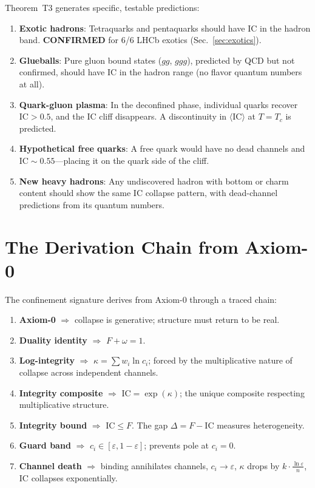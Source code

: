 \documentclass[11pt,a4paper]{article}
\theoremstyle{plain}
\theoremstyle{definition}
\theoremstyle{remark}
\newcommand{\eps}{\varepsilon}
\newcommand{\IC}{\mathrm{IC}}
\begin{document}
Theorem~T3 generates specific, testable predictions:

\begin{enumerate}
\item \textbf{Exotic hadrons}: Tetraquarks and pentaquarks should
  have $\IC$ in the hadron band.
  \textcolor{WeldGreen}{\textbf{CONFIRMED}} for 6/6 LHCb
  exotics (Sec.~\ref{sec:exotics}).

\item \textbf{Glueballs}: Pure gluon bound states ($gg$, $ggg$),
  predicted by QCD but not confirmed, should have $\IC$ in the
  hadron range (no flavor quantum numbers at all).

\item \textbf{Quark-gluon plasma}: In the deconfined phase,
  individual quarks recover $\IC > 0.5$, and the IC cliff
  disappears.  A discontinuity in $\langle\IC\rangle$ at
  $T = T_c$ is predicted.

\item \textbf{Hypothetical free quarks}: A free quark would have
  no dead channels and $\IC \sim 0.55$---placing it on the quark
  side of the cliff.

\item \textbf{New heavy hadrons}: Any undiscovered hadron with
  bottom or charm content should show the same IC collapse
  pattern, with dead-channel predictions from its quantum numbers.
\end{enumerate}


\section{The Derivation Chain from Axiom-0}\label{sec:axiom}

The confinement signature derives from Axiom-0 through a traced
chain:

\begin{enumerate}
\item \textbf{Axiom-0} $\Rightarrow$ collapse is generative;
  structure must return to be real.
\item \textbf{Duality identity} $\Rightarrow$ $F + \omega = 1$.
\item \textbf{Log-integrity} $\Rightarrow$
  $\kappa = \sum w_i \ln c_i$; forced by the multiplicative
  nature of collapse across independent channels.
\item \textbf{Integrity composite} $\Rightarrow$
  $\IC = \exp(\kappa)$; the unique composite respecting
  multiplicative structure.
\item \textbf{Integrity bound} $\Rightarrow$ $\IC \leq F$.
  The gap $\Delta = F - \IC$ measures heterogeneity.
\item \textbf{Guard band} $\Rightarrow$
  $c_i \in [\eps, 1{-}\eps]$; prevents pole at $c_i = 0$.
\item \textbf{Channel death} $\Rightarrow$ binding annihilates
  channels, $c_i \to \eps$, $\kappa$ drops by
  $k \cdot \frac{\ln \eps}{n}$, $\IC$ collapses exponentially.
\end{enumerate}
\end{document}
